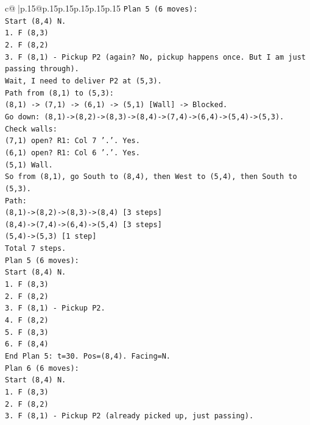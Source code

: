\documentclass{article}
\begin{document}
{\begin{supertabular}{c@{$\;$}|p{.15\linewidth}@{}p{.15\linewidth}p{.15\linewidth}p{.15\linewidth}p{.15\linewidth}p{.15\linewidth}}
{{{\texttt{Plan 5 (6 moves):} \\
\texttt{Start (8,4) N.} \\
\texttt{1. F (8,3)} \\
\texttt{2. F (8,2)} \\
\texttt{3. F (8,1) {-} Pickup P2 (again? No, pickup happens once. But I am just passing through).} \\
\texttt{Wait, I need to deliver P2 at (5,3).} \\
\texttt{Path from (8,1) to (5,3):} \\
\texttt{(8,1) {-}> (7,1) {-}> (6,1) {-}> (5,1) {[}Wall{]} {-}> Blocked.} \\
\texttt{Go down: (8,1){-}>(8,2){-}>(8,3){-}>(8,4){-}>(7,4){-}>(6,4){-}>(5,4){-}>(5,3).} \\
\texttt{Check walls:} \\
\texttt{(7,1) open? R1: Col 7 '.'. Yes.} \\
\texttt{(6,1) open? R1: Col 6 '.'. Yes.} \\
\texttt{(5,1) Wall.} \\
\texttt{So from (8,1), go South to (8,4), then West to (5,4), then South to (5,3).} \\
\texttt{Path:} \\
\texttt{(8,1){-}>(8,2){-}>(8,3){-}>(8,4) {[}3 steps{]}} \\
\texttt{(8,4){-}>(7,4){-}>(6,4){-}>(5,4) {[}3 steps{]}} \\
\texttt{(5,4){-}>(5,3) {[}1 step{]}} \\
\texttt{Total 7 steps.} \\
\texttt{Plan 5 (6 moves):} \\
\texttt{Start (8,4) N.} \\
\texttt{1. F (8,3)} \\
\texttt{2. F (8,2)} \\
\texttt{3. F (8,1) {-} Pickup P2.} \\
\texttt{4. F (8,2)} \\
\texttt{5. F (8,3)} \\
\texttt{6. F (8,4)} \\
\texttt{End Plan 5: t=30. Pos=(8,4). Facing=N.} \\
\texttt{Plan 6 (6 moves):} \\
\texttt{Start (8,4) N.} \\
\texttt{1. F (8,3)} \\
\texttt{2. F (8,2)} \\
\texttt{3. F (8,1) {-} Pickup P2 (already picked up, just passing).} \\
}}}
\end{supertabular}}
\end{document}
